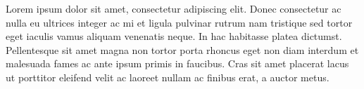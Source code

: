 Lorem ipsum dolor sit amet, consectetur adipiscing elit.
Donec consectetur ac nulla eu ultrices integer ac mi et ligula pulvinar rutrum nam tristique sed tortor eget iaculis vamus aliquam venenatis neque.
In hac habitasse platea dictumst.
Pellentesque sit amet magna non tortor porta rhoncus eget non diam interdum et malesuada fames ac ante ipsum primis in faucibus.
Cras sit amet placerat lacus ut porttitor eleifend velit ac laoreet nullam ac finibus erat, a auctor metus.
